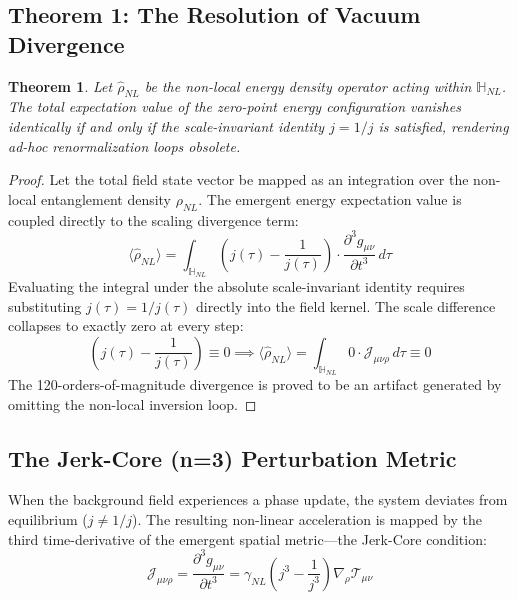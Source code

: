 \documentclass[11pt,a4paper]{article}
\theoremstyle{plain}
\newtheorem{theorem}{Theorem}[section]
\theoremstyle{definition}
\begin{document}
\subsection{Theorem 1: The Resolution of Vacuum Divergence}
\begin{theorem}
Let $\hat{\rho}_{NL}$ be the non-local energy density operator acting within $\mathbb{H}_{NL}$. The total expectation value of the zero-point energy configuration vanishes identically if and only if the scale-invariant identity $j = 1/j$ is satisfied, rendering ad-hoc renormalization loops obsolete.
\end{theorem}

\begin{proof}
Let the total field state vector be mapped as an integration over the non-local entanglement density $\rho_{NL}$. The emergent energy expectation value is coupled directly to the scaling divergence term:
\begin{equation}
\langle \hat{\rho}_{NL} \rangle = \int_{\mathbb{H}_{NL}} \left( j(\tau) - \frac{1}{j(\tau)} \right) \cdot \frac{\partial^3 g_{\mu\nu}}{\partial t^3} \, d\tau
\end{equation}
Evaluating the integral under the absolute scale-invariant identity requires substituting $j(\tau) = 1/j(\tau)$ directly into the field kernel. The scale difference collapses to exactly zero at every step:
\begin{equation}
\left( j(\tau) - \frac{1}{j(\tau)} \right) \equiv 0 \implies \langle \hat{\rho}_{NL} \rangle = \int_{\mathbb{H}_{NL}} 0 \cdot \mathcal{J}_{\mu\nu\rho} \, d\tau \equiv 0
\end{equation}
The 120-orders-of-magnitude divergence is proved to be an artifact generated by omitting the non-local inversion loop.
\end{proof}

\subsection{The Jerk-Core (n=3) Perturbation Metric}
When the background field experiences a phase update, the system deviates from equilibrium ($j \neq 1/j$). The resulting non-linear acceleration is mapped by the third time-derivative of the emergent spatial metric—the Jerk-Core condition:
\begin{equation}
\mathcal{J}_{\mu\nu\rho} = \frac{\partial^3 g_{\mu\nu}}{\partial t^3} = \gamma_{NL} \left( j^3 - \frac{1}{j^3} \right) \nabla_\rho \mathcal{T}_{\mu\nu}
\end{equation}
\end{document}
